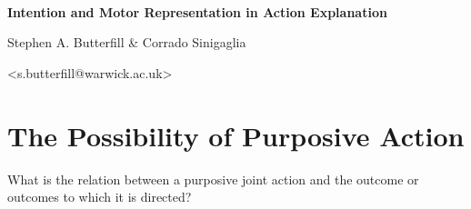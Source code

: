 \documentclass[11pt]{extarticle}
\date{}
\begin{document}
\begin{multicols}{3}

\setlength\footnotesep{1em}






\

\begin{center}
{\Large
\textbf{Intention and Motor Representation in Action Explanation}
}


Stephen A. Butterfill \& Corrado Sinigaglia

<s.butterfill@warwick.ac.uk>

\end{center}




\section{The Possibility of Purposive Action}
What is the relation between a purposive joint action and the outcome or outcomes to which it is directed?



\end{multicols}
\end{document}
